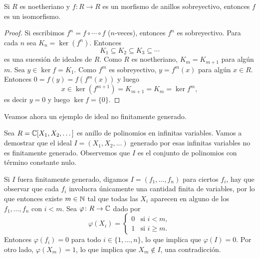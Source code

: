 \begin{proposition}
Si $R$ es noetheriano y $f\colon R\to R$ es un morfismo de anillos sobreyectivo, entonces $f$ es un isomorfismo.	
\end{proposition}

\begin{proof}
	Si escribimos $f^n=f\circ\cdots\circ f$ ($n$-veces), entonces $f^n$ es sobreyectivo. Para cada $n$ sea $K_n=\ker(f^n)$. Entonces 
	\[
	K_1\subseteq K_2\subseteq K_3\subseteq\cdots
	\] 
	es una sucesión de ideales de $R$. Como $R$ es noetheriano, $K_m=K_{m+1}$ para algún $m$. Sea $y\in\ker f=K_1$. Como $f^m$ es
	sobreyectivo, $y=f^m(x)$ para algún $x\in R$. Entonces
	$0=f(y)=f(f^m(x))$ 
	y luego 
	\[
	x\in \ker(f^{m+1})=K_{m+1}=K_m=\ker f^m,
	\]
	es decir $y=0$ y luego $\ker f=\{0\}$. 
\end{proof}

Veamos ahora un ejemplo de ideal no finitamente generado.

\begin{example}
	Sea $R=\mathbb{C}[X_1,X_2,\dots]$ es anillo de polinomios en infinitas variables. Vamos a demostrar que el ideal 
	$I=(X_1,X_2,\dots)$ generado por esas infinitas variables no es finitamente generado. Observemos que $I$ es el conjunto de polinomios con término constante nulo.  
	
	Si $I$ fuera finitamente generado, digamos 
	$I=(f_1,\dots,f_n)$ para ciertos $f_i$, hay que observar que cada $f_i$ involucra únicamente una cantidad finita de variables, por lo que entonces
	existe $m\in\mathbb{N}$ tal que todas las $X_i$ aparecen en alguno de los $f_1,\dots,f_n$ con $i<m$. Sea $\varphi\colon R\to\mathbb{C}$ 
	dado por
	\[
	\varphi(X_i)=
	\begin{cases}
		0 & \text{si $i<m$},\\
		1 & \text{si $i\geq m$}.
	\end{cases}
	\]
	Entonces $\varphi(f_i)=0$ para todo $i\in\{1,\dots,n\}$, lo que implica que $\varphi(I)=0$. Por otro lado, $\varphi(X_m)=1$, lo que implica que $X_m\not\in I$, una contradicción. 		
\end{example}


